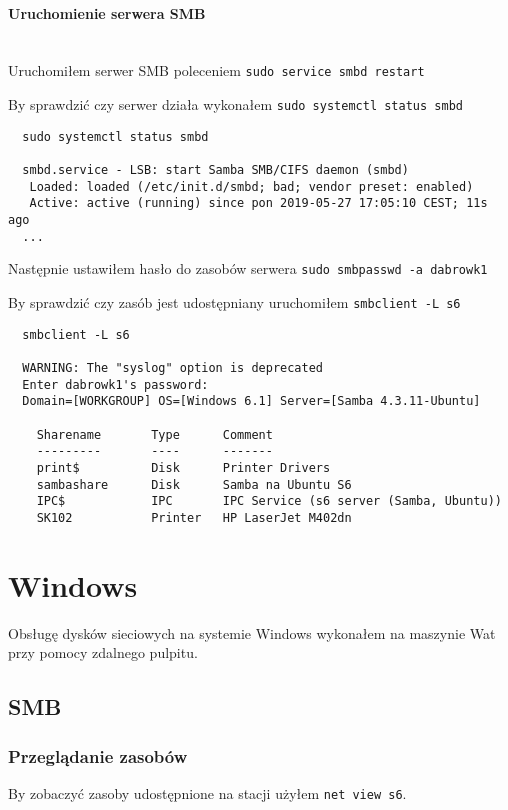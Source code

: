 \documentclass{article} %
\begin{document}
\paragraph{Uruchomienie serwera SMB} \mbox{} \\
Uruchomiłem serwer SMB poleceniem \texttt{sudo service smbd restart}

By sprawdzić czy serwer działa wykonałem \texttt{sudo systemctl status smbd}
\begin{verbatim}
  sudo systemctl status smbd

  smbd.service - LSB: start Samba SMB/CIFS daemon (smbd)
   Loaded: loaded (/etc/init.d/smbd; bad; vendor preset: enabled)
   Active: active (running) since pon 2019-05-27 17:05:10 CEST; 11s ago
  ...
\end{verbatim}

Następnie ustawiłem hasło do zasobów serwera \texttt{sudo smbpasswd -a dabrowk1}

By sprawdzić czy zasób jest udostępniany uruchomiłem \texttt{smbclient -L s6}
\begin{verbatim}
  smbclient -L s6  

  WARNING: The "syslog" option is deprecated
  Enter dabrowk1's password: 
  Domain=[WORKGROUP] OS=[Windows 6.1] Server=[Samba 4.3.11-Ubuntu]

	Sharename       Type      Comment
	---------       ----      -------
	print$          Disk      Printer Drivers
	sambashare      Disk      Samba na Ubuntu S6
	IPC$            IPC       IPC Service (s6 server (Samba, Ubuntu))
	SK102           Printer   HP LaserJet M402dn
\end{verbatim}

\section{Windows}
Obsługę dysków sieciowych na systemie Windows wykonałem na maszynie Wat przy pomocy zdalnego pulpitu.

\subsection{SMB}

\subsubsection{Przeglądanie zasobów}
By zobaczyć zasoby udostępnione na stacji użyłem \texttt{net view s6}.
\end{document}
